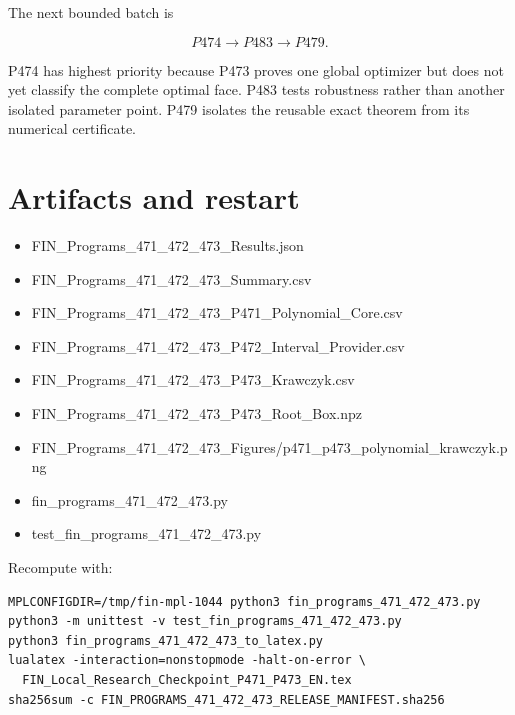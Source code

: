 \documentclass[11pt,a4paper,openany]{report}
\begin{document}
The next bounded batch is

\[
\boxed{P474\longrightarrow P483\longrightarrow P479}.
\]

P474 has highest priority because P473 proves one global optimizer but does not yet classify the complete optimal face. P483 tests robustness rather than another isolated parameter point. P479 isolates the reusable exact theorem from its numerical certificate.

\chapter{Artifacts and restart}

\begin{itemize}
\item 
FIN\_Programs\_471\_472\_473\_Results.json

\item 
FIN\_Programs\_471\_472\_473\_Summary.csv

\item 
FIN\_Programs\_471\_472\_473\_P471\_Polynomial\_Core.csv

\item 
FIN\_Programs\_471\_472\_473\_P472\_Interval\_Provider.csv

\item 
FIN\_Programs\_471\_472\_473\_P473\_Krawczyk.csv

\item 
FIN\_Programs\_471\_472\_473\_P473\_Root\_Box.npz

\item 
FIN\_Programs\_471\_472\_473\_Figures/\allowbreak{}p471\_p473\_polynomial\_krawczyk.png

\item 
fin\_programs\_471\_472\_473.py

\item 
test\_fin\_programs\_471\_472\_473.py

\end{itemize}

Recompute with:

\begin{Verbatim}[fontsize=\small]
MPLCONFIGDIR=/tmp/fin-mpl-1044 python3 fin_programs_471_472_473.py
python3 -m unittest -v test_fin_programs_471_472_473.py
python3 fin_programs_471_472_473_to_latex.py
lualatex -interaction=nonstopmode -halt-on-error \
  FIN_Local_Research_Checkpoint_P471_P473_EN.tex
sha256sum -c FIN_PROGRAMS_471_472_473_RELEASE_MANIFEST.sha256
\end{Verbatim}
\end{document}
